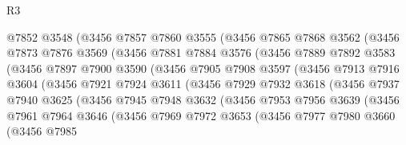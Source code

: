 \begin{lexlean}{R3}
\begin{coremodule}
                @7852
                @3548
                (@3456
                  @7857
                  @7860
                  @3555
                  (@3456
                    @7865
                    @7868
                    @3562
                    (@3456
                      @7873
                      @7876
                      @3569
                      (@3456
                        @7881
                        @7884
                        @3576
                        (@3456
                          @7889
                          @7892
                          @3583
                          (@3456
                            @7897
                            @7900
                            @3590
                            (@3456
                              @7905
                              @7908
                              @3597
                              (@3456
                                @7913
                                @7916
                                @3604
                                (@3456
                                  @7921
                                  @7924
                                  @3611
                                  (@3456
                                    @7929
                                    @7932
                                    @3618
                                    (@3456
                                      @7937
                                      @7940
                                      @3625
                                      (@3456
                                        @7945
                                        @7948
                                        @3632
                                        (@3456
                                          @7953
                                          @7956
                                          @3639
                                          (@3456
                                            @7961
                                            @7964
                                            @3646
                                            (@3456
                                              @7969
                                              @7972
                                              @3653
                                              (@3456
                                                @7977
                                                @7980
                                                @3660
                                                (@3456
                                                  @7985

\end{coremodule}
\end{lexlean}
